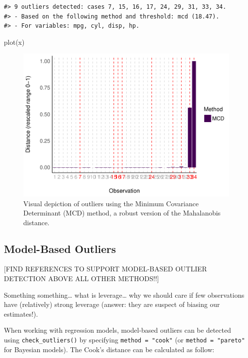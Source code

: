 \documentclass[
]{article}
\newenvironment{Shaded}{\begin{snugshade}}{\end{snugshade}}
\newcommand{\FunctionTok}[1]{\textcolor[rgb]{0.00,0.00,0.00}{#1}}
\newcommand{\NormalTok}[1]{#1}
\begin{document}
\begin{verbatim}
#> 9 outliers detected: cases 7, 15, 16, 17, 24, 29, 31, 33, 34.
#> - Based on the following method and threshold: mcd (18.47).
#> - For variables: mpg, cyl, disp, hp.
\end{verbatim}

\begin{Shaded}
\begin{Highlighting}[]
\FunctionTok{plot}\NormalTok{(x)}
\end{Highlighting}
\end{Shaded}

\begin{figure}
\includegraphics[width=1\linewidth]{paper_files/figure-latex/multivariate-1} \caption{Visual depiction of outliers using the Minimum Covariance Determinant (MCD) method, a robust version of the Mahalanobis distance.}\label{fig:multivariate}
\end{figure}

\hypertarget{model-based-outliers}{%
\subsection{Model-Based Outliers}\label{model-based-outliers}}

{[}FIND REFERENCES TO SUPPORT MODEL-BASED OUTLIER DETECTION ABOVE ALL OTHER METHODS!!{]}

Something something\ldots{} what is leverage\ldots{} why we should care if few observations have (relatively) strong leverage (answer: they are suspect of biasing our estimates!).

When working with regression models, model-based outliers can be detected using \texttt{check\_outliers()} by specifying \texttt{method\ =\ "cook"} (or \texttt{method\ =\ "pareto"} for Bayesian models). The Cook's distance can be calculated as follow:
\end{document}
